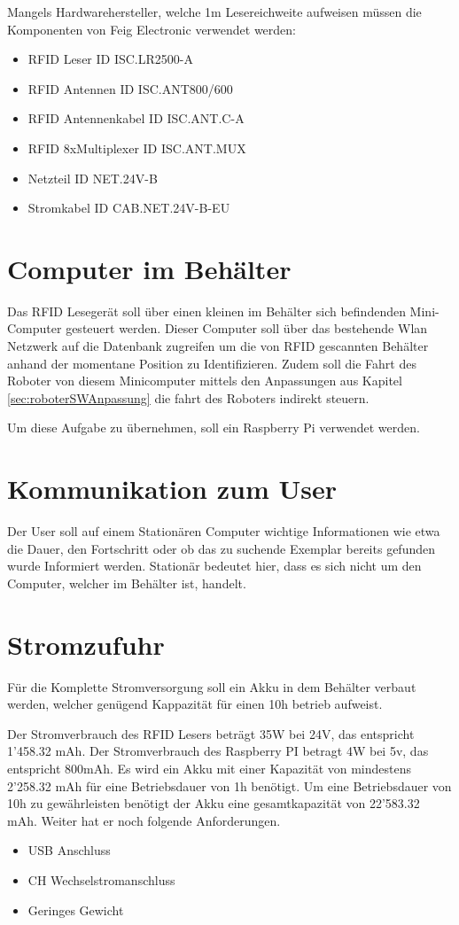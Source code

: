 Mangels Hardwarehersteller, welche 1m Lesereichweite aufweisen müssen die Komponenten von Feig Electronic verwendet werden:
\begin{itemize}
	\item RFID Leser ID ISC.LR2500-A
	\item RFID Antennen ID ISC.ANT800/600
	\item RFID Antennenkabel ID ISC.ANT.C-A
	\item RFID 8xMultiplexer ID ISC.ANT.MUX
	\item Netzteil ID NET.24V-B
	\item Stromkabel ID CAB.NET.24V-B-EU
\end{itemize}

\clearpage
\section{Computer im Behälter}
Das RFID Lesegerät soll über einen kleinen im Behälter sich befindenden Mini-Computer gesteuert werden. Dieser Computer soll über das bestehende Wlan Netzwerk auf die Datenbank zugreifen um die von RFID gescannten Behälter anhand der momentane Position zu Identifizieren.  
Zudem soll die Fahrt des Roboter von diesem Minicomputer mittels den Anpassungen aus Kapitel  \ref{sec:roboterSWAnpassung} die fahrt des Roboters indirekt steuern.

Um diese Aufgabe zu übernehmen, soll ein Raspberry Pi verwendet werden.

\section{Kommunikation zum User}
Der User soll auf einem Stationären Computer wichtige Informationen wie etwa die Dauer, den Fortschritt oder ob das zu suchende Exemplar bereits gefunden wurde Informiert werden. Stationär bedeutet hier, dass es sich nicht um den Computer, welcher im Behälter ist, handelt.

\section{Stromzufuhr}
Für die Komplette Stromversorgung soll ein Akku in dem Behälter verbaut werden, welcher genügend Kappazität für einen 10h betrieb aufweist.

Der Stromverbrauch des RFID Lesers beträgt 35W bei 24V, das entspricht 1'458.32 mAh.
Der Stromverbrauch des Raspberry PI betragt 4W bei 5v, das entspricht 800mAh.
Es wird ein Akku mit einer Kapazität von mindestens 2'258.32 mAh für eine Betriebsdauer von 1h benötigt. Um eine Betriebsdauer von 10h zu gewährleisten benötigt der Akku eine gesamtkapazität von 22'583.32 mAh.
Weiter hat er noch folgende Anforderungen.
\begin{itemize}
	\item USB Anschluss
	\item CH Wechselstromanschluss
	\item Geringes Gewicht
\end{itemize}

